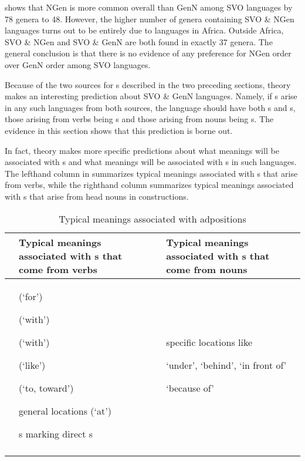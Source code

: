 \documentclass[output=paper]{langsci/langscibook}
\begin{document}
 shows that NGen is more common overall than GenN among SVO languages by 78 genera to 48. However, the higher number of genera containing SVO \& NGen languages turns out to be entirely due to languages in Africa. Outside Africa, SVO \& NGen and SVO \& GenN are both found in exactly 37 genera. The general conclusion is that there is no evidence of any preference for NGen order over GenN order among SVO languages.

Because of the two  sources for s described in the two preceding sections,  theory makes an interesting prediction about SVO \& GenN languages. Namely, if s arise in any such languages from both  sources, the language should have both s and s, those arising from verbs being s and those arising from nouns being s. The evidence in this section shows \largerpage that this prediction is borne out.

In fact,  theory makes more specific predictions about what meanings will be associated with s and what meanings will be associated with s in such languages. The lefthand column in  summarizes typical meanings associated with s that arise from verbs, while the righthand column summarizes typical meanings associated with s that arise from head nouns in  constructions.

\begin{table}
\caption{Typical meanings associated with adpositions} 
\label{extab:dryer:10}
\begin{tabularx}{\textwidth}{@{}l@{~}XlQ}
\lsptoprule
\bfseries & \bfseries Typical meanings associated with s that come from verbs & \bfseries & \bfseries Typical meanings associated with s that come from nouns\\
\midrule 
 & { (‘for’)}

{ (‘with’)}

{ (‘with’)}

{ (‘like’)}

{ (‘to, toward’)}

{general locations (‘at’)}

s marking direct s &  & {specific locations like}

{‘under’, ‘behind’, ‘in front of’}

‘because of’\\
\lspbottomrule
\end{tabularx}
\end{table}
\end{document}
